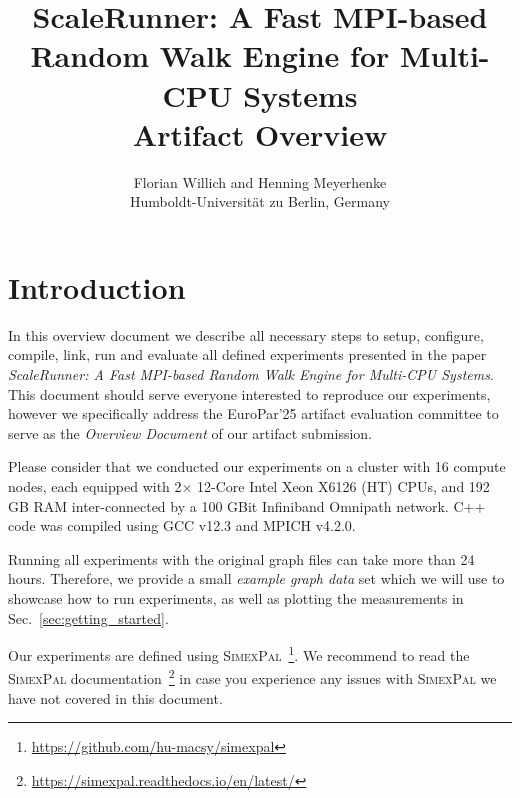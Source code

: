 \documentclass[11pt, a4paper]{scrartcl}
\newcommand{\simex}{\textsc{Simex\-Pal}\xspace}
\begin{document}
\lstset{  
  tabsize=2, 
  showspaces=false, 
  showstringspaces=false, 
  float=[htb], 
  captionpos=b, 
  basicstyle=\footnotesize, 
  frame=tbrl, %
  frameround=tttt, 
  numbers=left, 
  numberstyle=\tiny, 
  numberblanklines=false, 
  breaklines=true
} 

\title{\small{ScaleRunner: A Fast MPI-based \\ Random Walk Engine for Multi-CPU Systems} \\ \LARGE{Artifact Overview}}

\author{Florian Willich and Henning Meyerhenke \\ Humboldt-Universit\"at zu Berlin, Germany}

\maketitle

\section{Introduction}

In this overview document we describe all necessary steps to setup, configure,
compile, link, run and evaluate all defined experiments presented in the paper
\textit{ScaleRunner: A Fast MPI-based Random Walk Engine for Multi-CPU Systems}.
This document should serve everyone interested to reproduce our experiments,
however we specifically address the EuroPar'25 artifact evaluation committee to
serve as the \emph{Overview Document} of our artifact submission.

Please consider that we conducted our experiments on a cluster with 16 compute
nodes, each equipped with 2$\times$ 12-Core Intel Xeon X6126 (HT) CPUs, and 192
GB RAM inter-connected by a 100 GBit Infiniband Omnipath network. C++ code was
compiled using GCC v12.3 and MPICH v4.2.0.

Running all experiments with the original graph files can take more than 24
hours. Therefore, we provide a small \emph{example graph data} set which we will
use to showcase how to run experiments, as well as plotting the measurements in
Sec.~\ref{sec:getting_started}.

Our experiments are defined using
\simex~\footnote{\url{https://github.com/hu-macsy/simexpal}}. We recommend to
read the \simex
documentation~\footnote{\url{https://simexpal.readthedocs.io/en/latest/}} in
case you experience any issues with \simex we have not covered in this
document.
\end{document}
